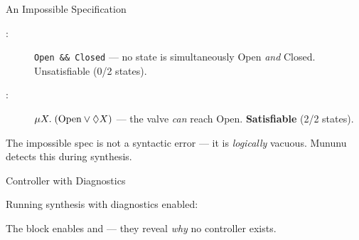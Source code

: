 \begin{frame}[fragile]{An Impossible Specification}
  

  \bigskip
  \begin{description}
    \item[:] \texttt{Open \&\& Closed} --- no state is simultaneously Open \emph{and} Closed. \alert{Unsatisfiable} (0/2 states).
    \item[:] $\mu X.\;(\text{Open} \lor \lozenge X)$ --- the valve \emph{can} reach Open. \textbf{Satisfiable} (2/2 states).
  \end{description}

  \medskip
  The impossible spec is not a syntactic error --- it is \emph{logically} vacuous.
  Mununu detects this during synthesis.
\end{frame}

\begin{frame}[fragile]{Controller with Diagnostics}
  

  \bigskip
  Running synthesis with diagnostics enabled:


  \medskip
  The  block enables  and  --- they reveal \emph{why} no controller exists.
\end{frame}

